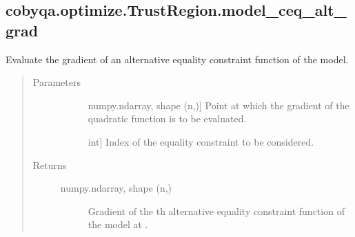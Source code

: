 \documentclass[letterpaper,10pt,english]{sphinxmanual}
\begin{document}
\begin{fulllineitems}
\begin{fulllineitems}
\end{fulllineitems}



\subsection{cobyqa.optimize.TrustRegion.model\_ceq\_alt\_grad}
\label{\detokenize{refs/generated/cobyqa.optimize.TrustRegion.model_ceq_alt_grad:cobyqa-optimize-trustregion-model-ceq-alt-grad}}\label{\detokenize{refs/generated/cobyqa.optimize.TrustRegion.model_ceq_alt_grad::doc}}

\begin{fulllineitems}
\label{\detokenize{refs/generated/cobyqa.optimize.TrustRegion.model_ceq_alt_grad:cobyqa.optimize.TrustRegion.model_ceq_alt_grad}}
\sphinxAtStartPar
Evaluate the gradient of an alternative equality constraint function of
the model.
\begin{quote}\begin{description}
\item[{Parameters}] \leavevmode\begin{description}
\item[{}] \leavevmode{[}numpy.ndarray, shape (n,){]}
\sphinxAtStartPar
Point at which the gradient of the quadratic function is to be
evaluated.

\item[{}] \leavevmode{[}int{]}
\sphinxAtStartPar
Index of the equality constraint to be considered.

\end{description}

\item[{Returns}] \leavevmode\begin{description}
\item[{numpy.ndarray, shape (n,)}] \leavevmode
\sphinxAtStartPar
Gradient of the \sphinxhyphen{}th alternative equality constraint function of
the model at .

\end{description}

\end{description}\end{quote}


\end{fulllineitems}
\end{fulllineitems}
\end{document}
